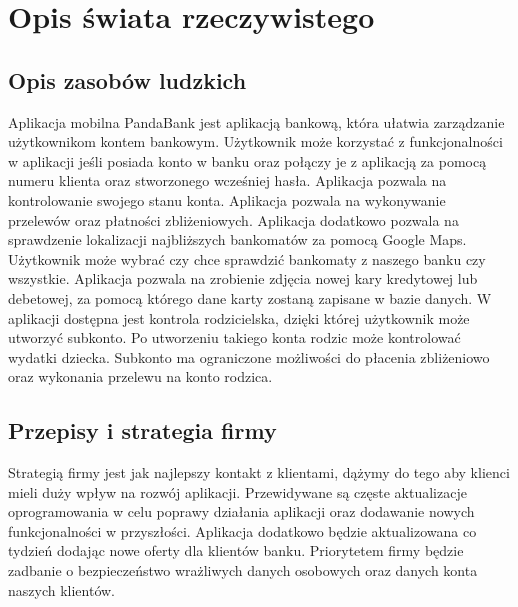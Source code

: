 \documentclass[12pt, letterpaper]{article}
\begin{document}
\newpage

\tableofcontents

\newpage


\section{Opis świata rzeczywistego}

	\subsection{Opis zasobów ludzkich}

	Aplikacja mobilna PandaBank jest aplikacją bankową, która ułatwia zarządzanie użytkownikom kontem bankowym. Użytkownik może korzystać z funkcjonalności w aplikacji jeśli posiada konto w banku oraz połączy je z aplikacją za pomocą numeru klienta oraz stworzonego wcześniej hasła. Aplikacja pozwala na kontrolowanie swojego stanu konta. Aplikacja pozwala na wykonywanie przelewów oraz płatności zbliżeniowych. Aplikacja dodatkowo pozwala na sprawdzenie lokalizacji najbliższych bankomatów za pomocą Google Maps. Użytkownik może wybrać czy chce sprawdzić bankomaty z naszego banku czy wszystkie. Aplikacja pozwala na zrobienie zdjęcia nowej kary kredytowej lub debetowej, za pomocą którego dane karty zostaną zapisane w bazie danych. W aplikacji dostępna jest kontrola rodzicielska, dzięki której użytkownik może utworzyć subkonto. Po utworzeniu takiego konta rodzic może kontrolować wydatki dziecka. Subkonto ma ograniczone możliwości do płacenia zbliżeniowo oraz wykonania przelewu na konto rodzica.

	\subsection{Przepisy i strategia firmy}
	
	Strategią firmy jest jak najlepszy kontakt z klientami, dążymy do tego aby klienci mieli duży wpływ na rozwój aplikacji. Przewidywane są częste aktualizacje oprogramowania w celu poprawy działania aplikacji oraz dodawanie nowych funkcjonalności w przyszłości. Aplikacja dodatkowo będzie aktualizowana co tydzień dodając nowe oferty dla klientów banku. Priorytetem firmy będzie zadbanie o bezpieczeństwo wrażliwych danych osobowych oraz danych konta naszych klientów. 
\end{document}
